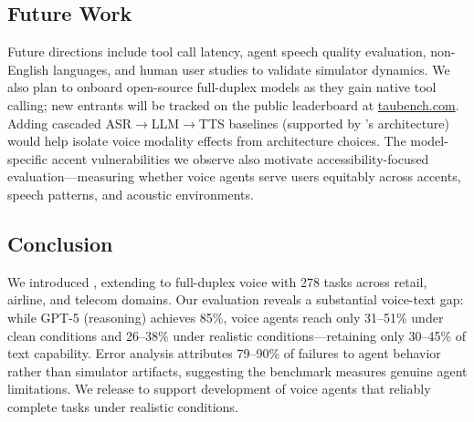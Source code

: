 \subsection{Future Work}

Future directions include tool call latency, agent speech quality evaluation, non-English languages, and human user studies to validate simulator dynamics. We also plan to onboard open-source full-duplex models as they gain native tool calling; new entrants will be tracked on the public leaderboard at \href{https://taubench.com}{taubench.com}. Adding cascaded ASR$\rightarrow$LLM$\rightarrow$TTS baselines (supported by \tauvoice{}'s architecture) would help isolate voice modality effects from architecture choices. The model-specific accent vulnerabilities we observe also motivate accessibility-focused evaluation---measuring whether voice agents serve users equitably across accents, speech patterns, and acoustic environments.

\subsection{Conclusion}

We introduced \textbf{\tauvoice{}}, extending \tautwobench{} to full-duplex voice with 278 tasks across retail, airline, and telecom domains. Our evaluation reveals a substantial voice-text gap: while GPT-5 (reasoning) achieves 85\%, voice agents reach only 31--51\% under clean conditions and 26--38\% under realistic conditions---retaining only 30--45\% of text capability. Error analysis attributes 79--90\% of failures to agent behavior rather than simulator artifacts, suggesting the benchmark measures genuine agent limitations. We release \tauvoice{} to support development of voice agents that reliably complete tasks under realistic conditions.
